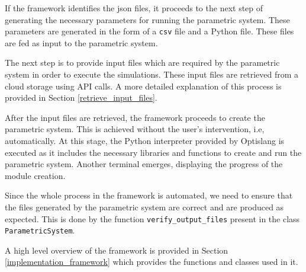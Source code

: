 If the framework identifies the \acrshort{json} files, it proceeds to the next step of generating the necessary parameters for running the parametric system. 
These parameters are generated in the form of a \texttt{csv} file and a Python file. These files are fed as input to the parametric system. 

The next step is to provide input files which are required by the parametric system in order to execute the simulations. These input files are retrieved from 
a cloud storage using API calls. A more detailed explanation of this process is provided in Section \ref{retrieve_input_files}. 

After the input files are retrieved, the framework proceeds to create the parametric system. This is achieved without the user's intervention, i.e, 
automatically. At this stage, the Python interpreter provided by Optislang is executed as it includes the necessary libraries and functions to create and run 
the parametric system. Another terminal emerges, displaying the progress of the module creation.

Since the whole process in the framework is automated, we need to ensure that the files generated by the parametric system are correct and are produced as 
expected. This is done by the function \texttt{verify\_output\_files} present in the class \texttt{ParametricSystem}. 

A high level overview of the framework is provided in Section \ref{implementation_framework} which provides the functions and classes used in it. 
